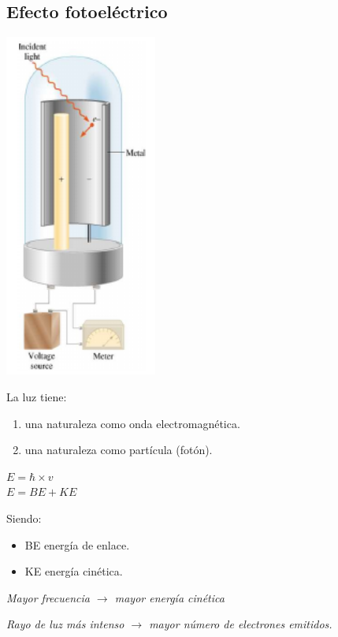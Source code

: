     \subsection{Efecto fotoeléctrico}
        \begin{center} \includegraphics[width=5cm]{./imagenes/efectoFotoelectrico.png} \end{center}
        \indent La luz tiene:
        \begin{enumerate} 
            \item una naturaleza como onda electromagnética.
            \item una naturaleza como partícula (fotón).
        \end{enumerate}
        \begin{center} 
            $E = \hbar \times v$ \\
            $E = BE + KE$
        \end{center}
        \indent Siendo:
        \begin{itemize}
            \item BE\: energía de enlace.
            \item KE\: energía cinética.
        \end{itemize}
        \begin{center} \textit{Mayor frecuencia $\rightarrow$ mayor energía cinética} \end{center}
        \begin{center} \textit{Rayo de luz más intenso $\rightarrow$ mayor número de electrones emitidos.} \end{center}
